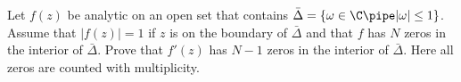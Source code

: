 Let $f(z)$ be analytic on an open set that contains
$\bar{\Delta}=\{\omega\in \C \pipe |\omega|\leq 1\}$. Assume that
$|f(z)|=1$ if $z$ is on the boundary of $\bar{\Delta}$ and that $f$
has $N$ zeros in the interior of $\bar{\Delta}$. Prove that $f'(z)$
has $N-1$ zeros in the interior of $\bar{\Delta}$. Here all zeros are
counted with multiplicity.
